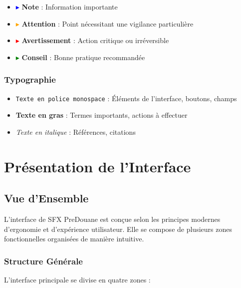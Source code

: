 \documentclass[12pt,a4paper]{report}
\begin{document}
\begin{itemize}[leftmargin=*]
    \item \textcolor{blue}{$\blacktriangleright$} \textbf{Note} : Information importante
    \item \textcolor{orange}{$\blacktriangleright$} \textbf{Attention} : Point nécessitant une vigilance particulière
    \item \textcolor{red}{$\blacktriangleright$} \textbf{Avertissement} : Action critique ou irréversible
    \item \textcolor{green}{$\blacktriangleright$} \textbf{Conseil} : Bonne pratique recommandée
\end{itemize}

\subsection{Typographie}

\begin{itemize}[leftmargin=*]
    \item \texttt{Texte en police monospace} : Éléments de l'interface, boutons, champs
    \item \textbf{Texte en gras} : Termes importants, actions à effectuer
    \item \textit{Texte en italique} : Références, citations
\end{itemize}

\chapter{Présentation de l'Interface}

\section{Vue d'Ensemble}

L'interface de SFX PreDouane est conçue selon les principes modernes d'ergonomie et d'expérience utilisateur. Elle se compose de plusieurs zones fonctionnelles organisées de manière intuitive.

\subsection{Structure Générale}

L'interface principale se divise en quatre zones :
\end{document}
